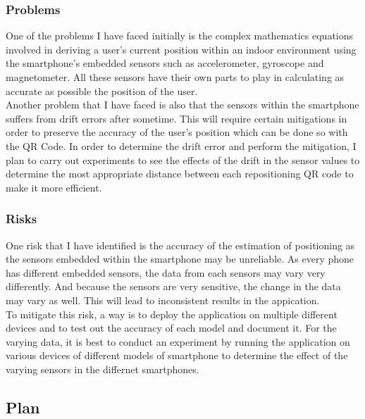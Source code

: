 \documentclass[11pt]{article}
\begin{document}
\subsubsection{Problems}\label{problems}

One of the problems I have faced initially is the complex mathematics equations involved in deriving a user's current position within an indoor environment using the smartphone's embedded sensors such as accelerometer, gyroscope and magnetometer. All these sensors have their own parts to play in calculating as accurate as possible the position of the user.\\

Another problem that I have faced is also that the sensors within the smartphone suffers from drift errors after sometime. This will require certain mitigations in order to preserve the accuracy of the user's position which can be done so with the QR Code. In order to determine the drift error and perform the mitigation, I plan to carry out experiments to see the effects of the drift in the sensor values to determine the most appropriate distance between each repositioning QR code to make it more efficient.\\

\subsubsection{Risks}\label{risks}

One risk that I have identified is the accuracy of the estimation of positioning as the sensors embedded within the smartphone may be unreliable. As every phone has different embedded sensors, the data from each sensors may vary very differently. And because the sensors are very sensitive, the change in the data may vary as well. This will lead to inconsistent results in the appication.\\
 
To mitigate this risk, a way is to deploy the application on multiple different devices and to test out the accuracy of each model and document it. For the varying data, it is best to conduct an experiment by running the application on various devices of different models of smartphone to determine the effect of the varying sensors in the differnet smartphones.

\subsection{Plan}\label{plan}
\end{document}
